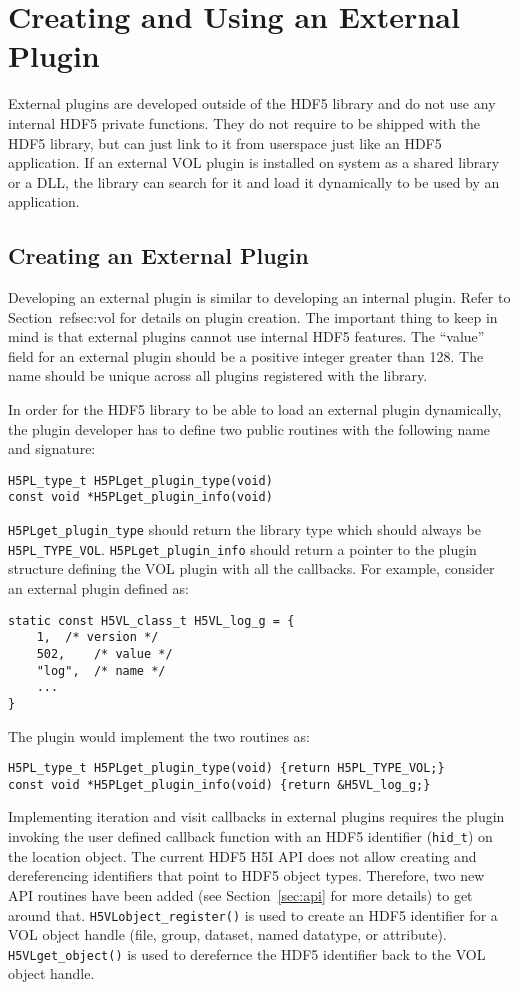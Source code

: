 \section{Creating and Using an External Plugin}
External plugins are developed outside of the HDF5 library and do not
use any internal HDF5 private functions. They do not require to be
shipped with the HDF5 library, but can just link to it from userspace
just like an HDF5 application. If an external VOL plugin is installed on system as a shared library or a DLL, the library can search for it and load it dynamically to be used by an application.

\subsection{Creating an External Plugin}
Developing an external plugin is similar to developing an internal plugin. Refer to Section~ref{sec:vol} for details on plugin creation. The important thing to keep in mind is that external plugins cannot use internal HDF5 features. The ``value'' field for an external plugin should be a positive integer greater than 128. The name should be unique across all plugins registered with the library.

In order for the HDF5 library to be able to load an external plugin dynamically, the plugin developer has to define two public routines with the following name and signature:
\begin{lstlisting}
H5PL_type_t H5PLget_plugin_type(void)
const void *H5PLget_plugin_info(void)
\end{lstlisting}
{\tt H5PLget\_plugin\_type} should return the library type which should always be {\tt H5PL\_TYPE\_VOL}. {\tt H5PLget\_plugin\_info} should return a pointer to the plugin structure defining the VOL plugin with all the callbacks. For example, consider an external plugin defined as:
\begin{lstlisting}
static const H5VL_class_t H5VL_log_g = {
    1,	/* version */
    502,	/* value */
    "log",	/* name */
    ...
}
\end{lstlisting}
The plugin would implement the two routines as:
\begin{lstlisting}
H5PL_type_t H5PLget_plugin_type(void) {return H5PL_TYPE_VOL;}
const void *H5PLget_plugin_info(void) {return &H5VL_log_g;}
\end{lstlisting}

Implementing iteration and visit callbacks in external plugins requires the plugin invoking the user defined callback function with an HDF5 identifier ({\tt hid\_t}) on the location object. The current HDF5 H5I API does not allow creating and dereferencing identifiers that point to HDF5 object types. Therefore, two new API routines have been added (see Section~\ref{sec:api} for more details) to get around that. {\tt H5VLobject\_register()} is used to create an HDF5 identifier for a VOL object handle (file, group, dataset, named datatype, or attribute). {\tt H5VLget\_object()} is used to derefernce the HDF5 identifier back to the VOL object handle.

